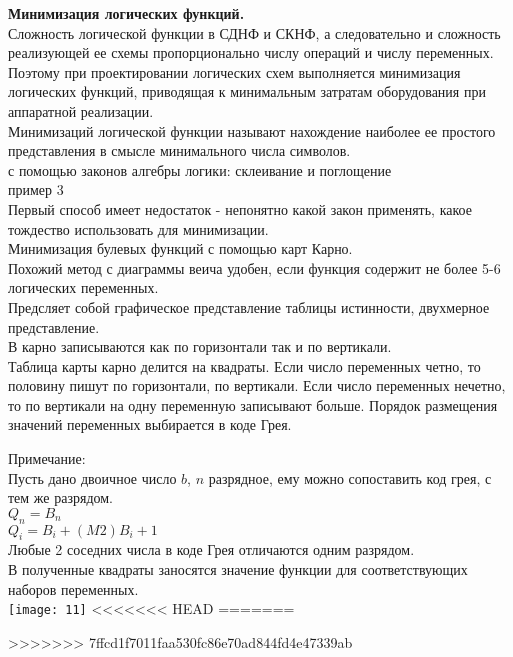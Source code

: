 \Large{ \textbf {Минимизация логических функций.}}\\
Сложность логической функции в СДНФ и СКНФ, а следовательно и сложность реализующей ее схемы пропорционально числу операций и числу переменных.
Поэтому при проектировании логических схем выполняется минимизация логических функций,
приводящая к минимальным затратам оборудования при аппаратной реализации.\\
Минимизаций логической функции называют нахождение наиболее ее простого представления в смысле минимального числа символов.\\
с помощью законов алгебры логики: склеивание и поглощение\\
пример 3\\
Первый способ имеет недостаток - непонятно какой закон применять, какое тождество использовать для минимизации.\\
Минимизация булевых функций с помощью карт Карно.\\
Похожий метод с диаграммы веича удобен, если функция содержит не более 5-6 логических переменных.\\
Предсляет собой графическое представление таблицы истинности, двухмерное представление.\\
В карно записываются как по горизонтали так и по вертикали.\\

Таблица карты карно делится на квадраты. Если число переменных четно,
то половину пишут по горизонтали, по вертикали. Если число переменных нечетно,
то по вертикали на одну переменную записывают больше.
Порядок размещения значений переменных выбирается в коде Грея.

Примечание:\\
Пусть дано двоичное число $b$, $n$ разрядное, ему можно сопоставить код грея, с тем же разрядом.\\
$Q_n = B_n$\\
$Q_i = B_i +(M2) B_i + 1$\\
Любые 2 соседних числа в коде Грея отличаются одним разрядом.\\
В полученные квадраты заносятся значение функции для соответствующих наборов переменных.\\
\texttt{[image: 11]}
<<<<<<< HEAD
=======


>>>>>>> 7ffcd1f7011faa530fc86e70ad844fd4e47339ab
